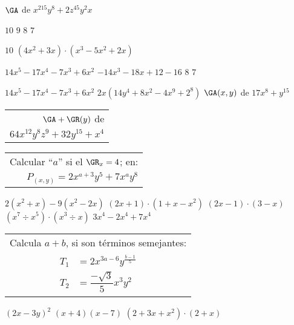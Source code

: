 $\GA$ de $x^215y^8+2z^45y^2x$
\begin{enum}
	\ii $10$
	\ii $9$
	\ii $8$
	\ii $7$
\end{enum}
$10$
$(4x^2+3x)\cdot(x^3-5x^2+2x)$
\begin{enum}
	\ii $14x^5-17x^4-7x^3+6x^2$
	\ii $-14x^3-18x+12-16$
	\ii $8$
	\ii $7$
\end{enum}
$14x^5-17x^4-7x^3+6x^2$
$2x(14y^4+8x^2-4x^9+2^8)$
$\GA(x,y)$ de $17x^8+y^{15}$
\begin{tabular}{r}
	$\GA+\GR(y)$ de \\
	$64x^{12}y^8z^9+32y^{15}+x^4$
\end{tabular}
\begin{tabular}{r}
	Calcular ``$a$'' si el $\GR_x=4$; en: \\
	$P_{(x,y)}=2x^{a+3}y^5+7x^ay^8$
\end{tabular}
$2(x^2+x)-9(x^2-2x)$
$(2x+1)\cdot(1+x-x^2)$
$(2x-1)\cdot(3-x)$
$(x^7\div x^5)\cdot(x^3\div x)$
$3x^4-2x^4+7x^4$
\begin{tabular}{c}
	Calcula $a+b$, si son t\'erminos semejantes: \\
	$\begin{aligned}
		T_1&=2x^{3a-6}y^{\frac{b-1}{5}} \\

		T_2&=\dfrac{-\sqrt{3}}{5}x^3y^2
	\end{aligned}$
\end{tabular}
$(2x-3y)^2$
$(x+4)(x-7)$
$(2+3x+x^2)\cdot(2+x)$
